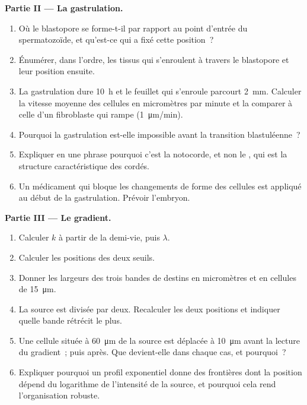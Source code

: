 \begin{problem}
\medskip
\noindent\textbf{Partie II --- La gastrulation.}
\begin{enumerate}[resume]
  \item Où le blastopore se forme-t-il par rapport au point d'entrée du
        spermatozoïde, et qu'est-ce qui a fixé cette position~?
  \item Énumérer, dans l'ordre, les tissus qui s'enroulent à travers le
        blastopore et leur position ensuite.
  \item La gastrulation dure \qty{10}{h} et le feuillet qui s'enroule
        parcourt \qty{2}{mm}. Calculer la vitesse moyenne des cellules en
        micromètres par minute et la comparer à celle d'un fibroblaste
        qui rampe (\qty{1}{\micro m/min}).
  \item Pourquoi la gastrulation est-elle impossible avant la transition
        blastuléenne~?
  \item Expliquer en une phrase pourquoi c'est la notocorde, et non le
        , qui est la structure caractéristique des cordés.
  \item Un médicament qui bloque les changements de forme des cellules
        est appliqué au début de la gastrulation. Prévoir l'embryon.
\end{enumerate}

\medskip
\noindent\textbf{Partie III --- Le gradient.}
\begin{enumerate}[resume]
  \item Calculer $k$ à partir de la demi-vie, puis $\lambda$.
  \item Calculer les positions des deux seuils.
  \item Donner les largeurs des trois bandes de destins en micromètres
        et en cellules de \qty{15}{\micro m}.
  \item La source est divisée par deux. Recalculer les deux positions et
        indiquer quelle bande rétrécit le plus.
  \item Une cellule située à \qty{60}{\micro m} de la source est
        déplacée à \qty{10}{\micro m} avant la lecture du gradient~; puis
        après. Que devient-elle dans chaque cas, et pourquoi~?
  \item Expliquer pourquoi un profil exponentiel donne des frontières
        dont la position dépend du logarithme de l'intensité de la
        source, et pourquoi cela rend l'organisation robuste.
\end{enumerate}


\end{problem}
